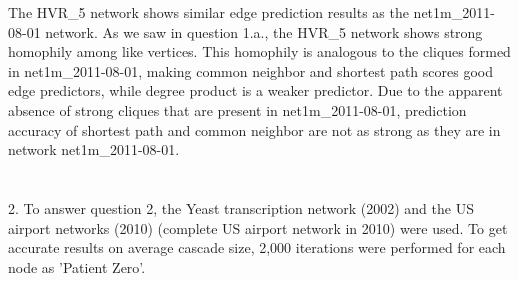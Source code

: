 \documentclass[11pt, oneside]{article}   	%
\begin{document}
\indent\indent The HVR\_5 network shows similar edge prediction results as the net1m\_2011-08-01 network.  As we saw in question 1.a., the HVR\_5 network shows strong homophily among like vertices.  This homophily is analogous to the cliques formed in net1m\_2011-08-01, making common neighbor and shortest path scores good edge predictors, while degree product is a weaker predictor.  Due to the apparent absence of strong cliques that are present in net1m\_2011-08-01, prediction accuracy of shortest path and common neighbor are not as strong as they are in network net1m\_2011-08-01.\\\\\\
2.  To answer question 2, the Yeast transcription network (2002)  and the US airport networks (2010) (complete US airport network in 2010) were used.  To get accurate results on average cascade size, 2,000 iterations were performed for each node as 'Patient Zero'.\\\\\\\\\\\\\\\\\\\\
\end{document}
